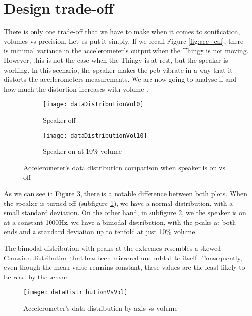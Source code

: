 \section{Design trade-off}

There is only one trade-off that we have to make when it comes to sonification, volumes vs precision. Let us put it simply. If we recall Figure \ref{fig:acc_cal}, there is minimal variance in the accelerometer's output when the Thingy is not moving. However, this is not the case when the Thingy is at rest, but the speaker is working. In this scenario, the speaker makes the \gls{pcb} vibrate in a way that it distorts the accelerometers measurements. We are now going to analyse if and how much the distortion increases with volume .


\begin{figure}[hbt!]
	\centering
	\begin{subfigure}{\linewidth}
		\centering
		\texttt{[image: dataDistributionVol0]}
		\caption{Speaker off}
		\label{fig:dataDistributionNoVol}
	\end{subfigure}
	\begin{subfigure}{\linewidth}
		\centering
		\texttt{[image: dataDistributionVol10]}
		\caption{Speaker on at 10\% volume}
		\label{fig:dataDistributionVol}
	\end{subfigure}
	\caption{Accelerometer's data distribution comparison when speaker is on vs off}
	\label{fig:dataDistribution}
\end{figure}

As we can see in Figure \ref{fig:dataDistribution}, there is a notable difference between both plots. When the speaker is turned off (subfigure \ref{fig:dataDistributionNoVol}), we have a normal distribution, with a small standard deviation. On the other hand, in subfigure  \ref{fig:dataDistributionVol}, we the speaker is on at a constant 1000Hz, we have a bimodal distribution, with the peaks at both ends and a standard deviation up to tenfold at just 10\% volume.

The bimodal distribution with peaks at the extremes resembles a skewed Gaussian distribution that has been mirrored and added to itself. Consequently, even though the mean value remains constant, these values are the least likely to be read by the sensor.


\begin{figure}[hbt!]
	\centering
	\texttt{[image: dataDistributionVsVol]}
	\caption{Accelerometer's data distribution by axis vs volume}
	\label{fig:dataDistributionVsVol}
\end{figure}

